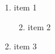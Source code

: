 \documentclass{article}
\begin{document}
 
\setcounter{secnumdepth}{0}

\begin{enumerate}
    \setcounter{enumi}{0}
    \item item 1

\begin{enumerate}
    \setcounter{enumi}{1}
    \item item 2
\end{enumerate}

    \item item 3
\end{enumerate}
\end{document}
